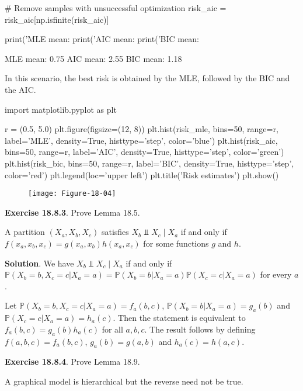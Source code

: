 \begin{python}
# Remove samples with unsuccessful optimization
risk_aic = risk_aic[np.isfinite(risk_aic)]

print('MLE mean: %
print('AIC mean: %
print('BIC mean: %
\end{python}

\begin{console}
MLE mean: 0.75
AIC mean: 2.55
BIC mean: 1.18
\end{console}

In this scenario, the best risk is obtained by the MLE, followed by the
BIC and the AIC.

\begin{python}
import matplotlib.pyplot as plt

r = (0.5, 5.0)
plt.figure(figsize=(12, 8))
plt.hist(risk_mle, bins=50, range=r, label='MLE', density=True, histtype='step', color='blue')
plt.hist(risk_aic, bins=50, range=r, label='AIC', density=True, histtype='step', color='green')
plt.hist(risk_bic, bins=50, range=r, label='BIC', density=True, histtype='step', color='red')
plt.legend(loc='upper left')
plt.title('Risk estimates')
plt.show()
\end{python}

\begin{figure}[H]
\centering
\texttt{[image: Figure-18-04]}
\end{figure}

\textbf{Exercise 18.8.3}. Prove Lemma 18.5.

A partition \((X_a, X_b, X_c)\) satisfies
\(X_b \text{ ⫫ } X_c \; | \; X_a\) if and only if
\(f(x_a, x_b, x_c) = g(x_a, x_b) h(x_a, x_c)\) for some functions \(g\)
and \(h\).

\textbf{Solution}. We have \(X_b \text{ ⫫ } X_c \; | \; X_a\) if and
only if
\(\mathbb{P}(X_b = b, X_c = c | X_a = a) = \mathbb{P}(X_b = b | X_a = a) \mathbb{P}(X_c = c | X_a = a)\)
for every \(a\).

Let \(\mathbb{P}(X_b = b, X_c = c | X_a = a) = f_a(b, c)\),
\(\mathbb{P}(X_b = b | X_a = a) = g_a(b)\) and
\(\mathbb{P}(X_c = c | X_a = a) = h_a(c)\). Then the statement is
equivalent to \(f_a(b, c) = g_a(b) h_a(c)\) for all \(a, b, c\). The
result follows by defining \(f(a, b, c) = f_a(b, c)\),
\(g_a(b) = g(a, b)\) and \(h_a(c) = h(a, c)\).

\textbf{Exercise 18.8.4}. Prove Lemma 18.9.

A graphical model is hierarchical but the reverse need not be true.

